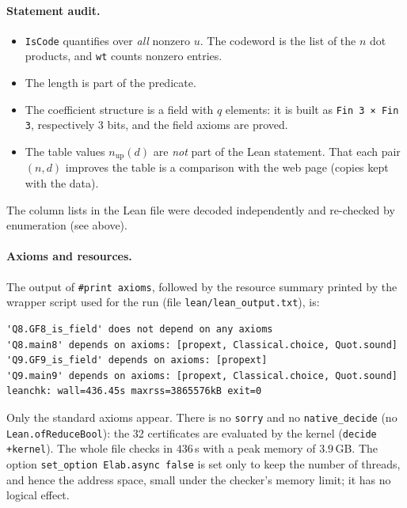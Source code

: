 \documentclass[11pt]{article}
\numberwithin{equation}{section}
\theoremstyle{definition}
\theoremstyle{remark}
\begin{document}
\paragraph{Statement audit.}
\begin{itemize}
\item \texttt{IsCode} quantifies over \emph{all} nonzero $u$. The codeword is the list of the $n$ dot
products, and \texttt{wt} counts nonzero entries.
\item The length is part of the predicate.
\item The coefficient structure is a field with $q$ elements: it is built as \texttt{Fin 3 × Fin 3}, respectively $3$ bits, and the field axioms are proved.
\item The table values $n_{\mathrm{up}}(d)$ are \emph{not} part of the Lean statement. That each pair
$(n,d)$ improves the table is a comparison with the web page (copies kept with the data).
\end{itemize}
The column lists in the Lean file were decoded independently and re-checked by enumeration (see above).

\paragraph{Axioms and resources.} The output of \texttt{\#print axioms}, followed by the resource
summary printed by the wrapper script used for the run (file \texttt{lean/lean\_output.txt}), is:
\begin{lstlisting}
'Q8.GF8_is_field' does not depend on any axioms
'Q8.main8' depends on axioms: [propext, Classical.choice, Quot.sound]
'Q9.GF9_is_field' depends on axioms: [propext]
'Q9.main9' depends on axioms: [propext, Classical.choice, Quot.sound]
leanchk: wall=436.45s maxrss=3865576kB exit=0
\end{lstlisting}
Only the standard axioms appear. There is no \texttt{sorry} and no \texttt{native\_decide}
(no \texttt{Lean.ofReduceBool}): the 32 certificates are evaluated by the kernel
(\texttt{decide +kernel}). The whole file checks in $436$\,s with a peak memory of $3.9$\,GB.
The option \texttt{set\_option Elab.async false} is set only to keep the number of threads, and hence
the address space, small under the checker's memory limit; it has no logical effect.
\end{document}
